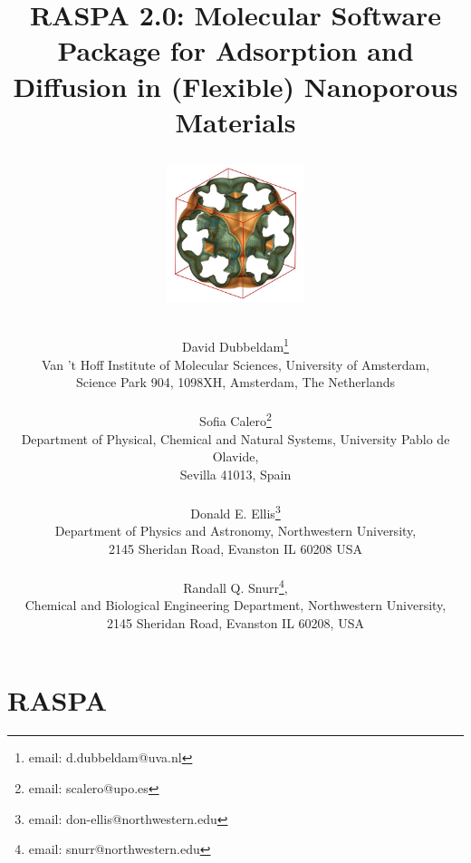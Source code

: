 \documentclass[onecolumn]{book}
\begin{document}
\title{RASPA 2.0: Molecular Software Package for Adsorption and Diffusion in (Flexible) Nanoporous Materials
\vskip 0.25cm
\begin{figure}[H]
\centering
\includegraphics[width=4cm]{RHO.jpg}
\end{figure}}
\author{David Dubbeldam\footnote{email: d.dubbeldam@uva.nl}\\
Van 't Hoff Institute of Molecular Sciences, University of Amsterdam,\\
Science Park 904, 1098XH, Amsterdam, The Netherlands\\\\
Sofia Calero\footnote{email: scalero@upo.es}\\
Department of Physical, Chemical and Natural Systems,
University Pablo de Olavide,\\
Sevilla 41013, Spain\\\\
Donald E. Ellis\footnote{email: don-ellis@northwestern.edu}\\
Department of Physics and Astronomy, Northwestern University,\\
2145 Sheridan Road, Evanston IL  60208  USA\\\\
Randall Q. Snurr\footnote{email: snurr@northwestern.edu},\\
Chemical and Biological Engineering Department, Northwestern University,\\
2145 Sheridan Road, Evanston IL  60208,  USA}
\maketitle

\tableofcontents

\part{RASPA}







\end{document}
